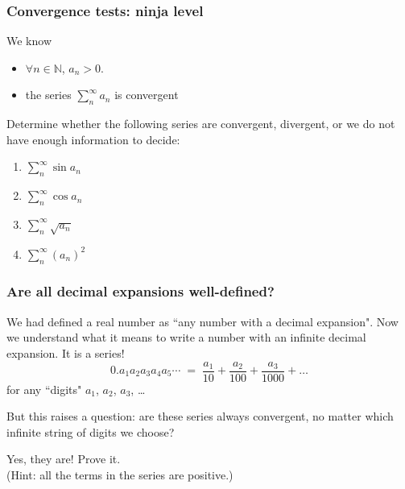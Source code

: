 \begin{frame}[t]
	\frametitle{Convergence tests: ninja level}

	We know
	\begin{itemize}
		\item $\displaystyle \forall n \in \mathbb{N}$, $\displaystyle a_{n}> 0$.

		\item the series $\displaystyle \sum_{n}^{\infty}a_{n}$ is convergent
	\end{itemize}

	Determine whether the following series are convergent, divergent, or we do not
	have enough information to decide:
	\begin{multicols}{2}
		\begin{enumerate}
			\item $\displaystyle \sum_{n}^{\infty}\sin a_{n}$

			\item $\displaystyle \sum_{n}^{\infty}\cos a_{n}$

			\item $\displaystyle \sum_{n}^{\infty}\sqrt{a_{n}}$

			\item $\displaystyle \sum_{n}^{\infty}\left( a_{n}\right)^{2}$
		\end{enumerate}
	\end{multicols}
\end{frame}

\begin{frame}[t]
	\fontsize{13}{13}\selectfont
	\frametitle{Are all decimal expansions well-defined?}

	We had defined a real number as ``any number with a decimal expansion". Now we
	understand what it means to write a number with an infinite decimal expansion.
	It is a series!
	\[
		0.a_{1}a_{2}a_{3}a_{4}a_{5}\cdots \; = \; \frac{a_{1}}{10}+ \frac{a_{2}}{100}
		+ \frac{a_{3}}{1000}+ \ldots
	\]
	for any ``digits" $a_{1}$, $a_{2}$, $a_{3}$, \ldots

	But this raises a question: are these series always convergent, no matter
	which infinite string of digits we choose?

	Yes, they are! Prove it. \\ (Hint: all the terms in the series are positive.)
\end{frame}

